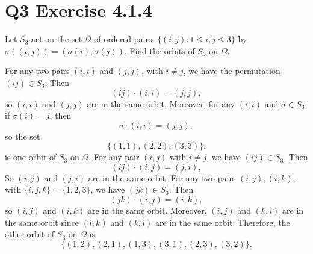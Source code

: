 \documentclass[12pt]{article}
\newenvironment{problem}
    {\begin{lrbox}{\mybox}\begin{minipage}{0.98\textwidth}}
    {\end{minipage}\end{lrbox}\framebox[\textwidth]{\usebox{\mybox}}}
\newcommand{\<}{\left\langle} %
\renewcommand{\>}{\right\rangle} %
\begin{document}
\newpage
\section*{Q3 Exercise 4.1.4}
\begin{problem}
    Let $S_3$ act on the set $\Omega$ of ordered pairs: $\{(i,j) : 1\leq i, j \leq 3\}$ by $\sigma((i,j)) = (\sigma(i),\sigma(j))$. Find the orbits of $S_3$ on $\Omega$.
\end{problem}
\medskip

For any two pairs $(i,i)$ and $(j,j)$, with $i\ne j$, we have the permutation $(ij)\in S_3$. Then
\[(ij)\cdot(i,i) = (j,j),\]
so $(i,i)$ and $(j,j)$ are in the same orbit. Moreover, for any $(i,i)$ and $\sigma\in S_3$, if $\sigma(i) = j$, then
\[\sigma\cdot(i,i) = (j,j),\]
so the set
\[\{(1,1), (2,2), (3,3)\}.\]
is one orbit of $S_3$ on $\Omega$. For any pair $(i,j)$ with $i\ne j$, we have $(ij)\in S_3$. Then
\[(ij) \cdot (i,j) = (j,i),\]
So $(i,j)$ and $(j,i)$ are in the same orbit. For any two pairs $(i,j),(i,k)$, with $\{i,j,k\} = \{1,2,3\}$, we have $(jk)\in S_3$. Then
\[(jk) \cdot (i,j) = (i,k),\]
so $(i,j)$ and $(i,k)$ are in the same orbit. Moreover, $(i,j)$ and $(k,i)$ are in the same orbit since $(i,k)$ and $(k,i)$ are in the same orbit. Therefore, the other orbit of $S_3$ on $\Omega$ is
\[\{(1,2),(2,1),(1,3),(3,1),(2,3),(3,2)\}.\]
\end{document}
